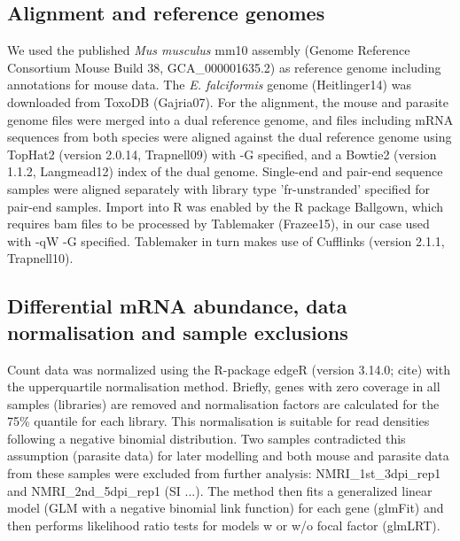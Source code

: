 \documentclass{bmcart}
\begin{document}
\subsection{Alignment and reference genomes}
We used the published \textit{Mus musculus} mm10 assembly (Genome
Reference Consortium Mouse Build 38, GCA\_000001635.2) as reference
genome including annotations for mouse data. The
\textit{E. falciformis} genome (Heitlinger14) was downloaded from
ToxoDB (Gajria07). For the alignment, the mouse and parasite genome
files were merged into a dual reference genome, and files including
mRNA sequences from both species were aligned against the dual
reference genome using TopHat2 (version 2.0.14, Trapnell09) with -G
specified, and a Bowtie2 (version 1.1.2, Langmead12) index of the dual
genome. Single-end and pair-end sequence samples were aligned
separately with library type 'fr-unstranded' specified for pair-end
samples. Import into R was enabled by the R package Ballgown, which
requires bam files to be processed by Tablemaker (Frazee15), in our
case used with -qW -G specified. Tablemaker in turn makes use of
Cufflinks (version 2.1.1, Trapnell10).

\subsection{Differential mRNA abundance, data normalisation and sample exclusions}
Count data was normalized using the R-package edgeR (version 3.14.0;
cite) with the upperquartile normalisation method. Briefly, genes with
zero coverage in all samples (libraries) are removed and normalisation
factors are calculated for the 75\% quantile for each library. This
normalisation is suitable for read densities following a negative
binomial distribution. Two samples contradicted this assumption
(parasite data) for later modelling and both mouse and parasite data
from these samples were excluded from further analysis:
NMRI\_1st\_3dpi\_rep1 and NMRI\_2nd\_5dpi\_rep1 (SI ...). The method
then fits a generalized linear model (GLM with a negative binomial
link function) for each gene (glmFit) and then performs likelihood
ratio tests for models w or w/o focal factor (glmLRT).

\end{document}
